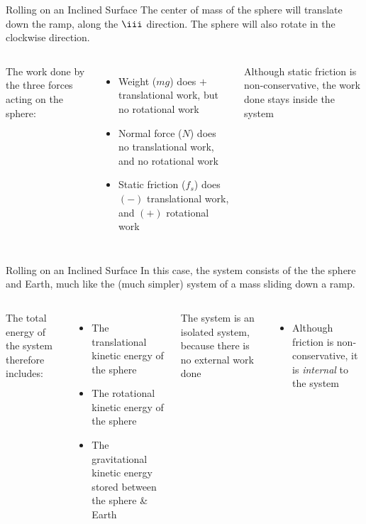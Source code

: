 \documentclass[12pt,compress,aspectratio=169]{beamer}
\begin{document}
\begin{frame}{Rolling on an Inclined Surface}
  The center of mass of the sphere will translate down the ramp, along the
  $\iii$ direction. The sphere will also rotate in the clockwise direction.

  \vspace{.2in}
  \begin{columns}
    

    The work done by the three forces acting on the sphere:
    \begin{itemize}
    \item Weight ($mg$) does $+$ translational work, but no rotational
      work
    \item Normal force ($N$) does no translational work, and no rotational
      work
    \item Static friction ($f_s$) does $(-)$ translational work, and $(+)$
      rotational work
    \end{itemize}
    Although static friction is non-conservative, the work done stays inside
    the system
  \end{columns}    
\end{frame}



\begin{frame}{Rolling on an Inclined Surface}
  In this case, the system consists of the the sphere and Earth, much like the
  (much simpler) system of a mass sliding down a ramp.

  \vspace{.2in}
  \begin{columns}
    

    The total energy of the system therefore includes:
    \begin{itemize}
    \item The translational kinetic energy of the sphere
    \item The rotational kinetic energy of the sphere
    \item The gravitational kinetic energy stored between the sphere \& Earth
    \end{itemize}
    The system is an isolated system, because there is no external work done
    \begin{itemize}
    \item Although friction is non-conservative, it is \emph{internal} to the
      system
    \end{itemize}
  \end{columns}
\end{frame}
\end{document}
